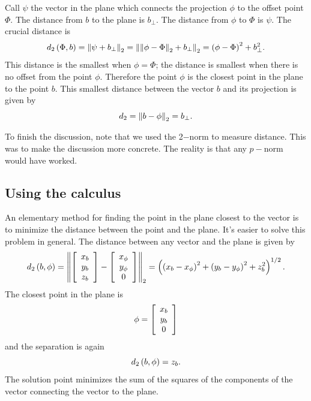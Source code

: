 Call $\psi$ the vector in the plane which connects the projection $\phi$ to the offset point $\Phi$. The distance from $b$ to the plane is $b_{\perp}$. The distance from $\phi$ to $\Phi$ is $\psi$. The crucial distance is 
\begin{equation}
  d_{2}\paren{\Phi,b} = \normt{\psi+b_{\perp}} = \normt{\normt{\phi-\Phi}+b_{\perp}} = \paren{\phi-\Phi}^{2} + b_{\perp}^{2}.
\end{equation}
This distance is the smallest when $\phi = \Phi$; the distance is smallest when there is no offset from the point $\phi$. Therefore the point $\phi$ is the closest point in the plane to the point $b$. This smallest distance between the vector $b$ and its projection is given by
\begin{equation}
  d_{2} = \normt{b-\phi}=b_{\perp}.
\end{equation}

To finish the discussion, note that we used the 2$-$norm to measure distance. This was to make the discussion more concrete. The reality is that any $p-$norm would have worked.

\subsection{Using the calculus}
An elementary method for finding the point in the plane closest to the vector is to minimize the distance between the point and the plane. It's easier to solve this problem in general. The distance between any vector and the plane is given by
\begin{equation}
  d_{2}\paren{b,\phi}=\normt{\mat{c}{x_{b}\\y_{b}\\z_{b}}-\mat{c}{x_{\phi}\\y_{\phi}\\0}} = \paren{\paren{x_{b}-x_{\phi}}^{2} + \paren{y_{b}-y_{\phi}}^{2} + z_{b}^{2}}^{1/2}.
\end{equation}
The closest point in the plane is 
\begin{equation}
  \phi = \mat{c}{x_{b}\\y_{b}\\0}
\end{equation}
and the separation is again
\begin{equation}
  d_{2}\paren{b,\phi} = z_{b}.
\end{equation}
The solution point minimizes the sum of the squares of the components of the vector connecting the vector to the plane.

